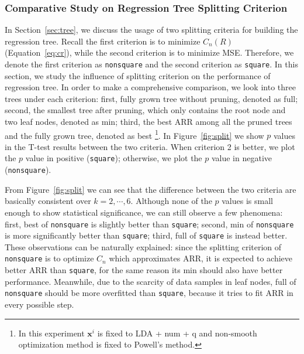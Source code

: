 \subsubsection{Comparative Study on Regression Tree Splitting Criterion}
In Section~\ref{sec:tree}, we discuss the usage of two splitting criteria for building the regression tree. Recall the first criterion is to minimize $C_n(R)$ (Equation~\ref{eq:cr}), while the second criterion is to minimize MSE. Therefore, we denote the first criterion as \texttt{nonsquare} and the second criterion as \texttt{square}. In this section, we study the influence of splitting criterion on the performance of regression tree. In order to make a comprehensive comparison, we look into three trees under each criterion: first, fully grown tree without pruning, denoted as \textsf{full}; second, the smallest tree after pruning, which only contains the root node and two leaf nodes, denoted as \textsf{min}; third, the best ARR among all the pruned trees and the fully grown tree, denoted as \textsf{best} \footnote{In this experiment $\mathbf{x}^i$ is fixed to LDA + num + q and non-smooth optimization method is fixed to Powell's method.}. In Figure~\ref{fig:split} we show $p$ values in the T-test results between the two criteria. When criterion 2 is better, we plot the $p$ value in positive (\texttt{square}); otherwise, we plot the $p$ value in negative (\texttt{nonsquare}). 

From Figure~\ref{fig:split} we can see that the difference between the two criteria are basically consistent over $k=2,\cdots, 6$. Although none of the $p$ values is small enough to show statistical significance, we can still observe a few phenomena: first, \textsf{best} of \texttt{nonsquare} is slightly better than \texttt{square}; second, \textsf{min} of \texttt{nonsquare} is more significantly better than \texttt{square}; third, \textsf{full} of \texttt{square} is instead better. These observations can be naturally explained: since the splitting criterion of \texttt{nonsquare} is to optimize $C_n$ which approximates ARR, it is expected to achieve better ARR than \texttt{square}, for the same reason its \textsf{min} should also have better performance. Meanwhile, due to the scarcity of data samples in leaf nodes, \textsf{full} of \texttt{nonsquare} should be more overfitted than \texttt{square}, because it tries to fit ARR in every possible step. 

